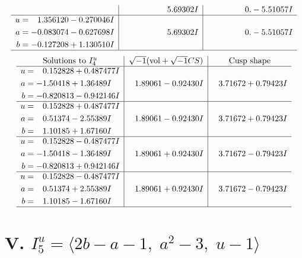 \documentclass[1p]{elsarticle_modified}
\theoremstyle{definition}
\newcommand{\I}{\sqrt{-1}}
\begin{document}
$$\begin{array}{c|c|c}
 & \phantom{-0.000000 -}5.69302 I & \phantom{-0.000000 } 0. - 5.51057 I \\ \hline\begin{aligned}
u &= \phantom{-}1.356120 - 0.270046 I \\
a &= -0.083074 - 0.627698 I \\
b &= -0.127208 + 1.130510 I\end{aligned}
 & \phantom{-0.000000 -}5.69302 I & \phantom{-0.000000 } 0. - 5.51057 I\\
 \hline 
 \end{array}$$\newpage$$\begin{array}{c|c|c}  
\text{Solutions to }I^u_{4}& \I (\text{vol} + \sqrt{-1}CS) & \text{Cusp shape}\\
 \hline 
\begin{aligned}
u &= \phantom{-}0.152828 + 0.487477 I \\
a &= -1.50418 + 1.36489 I \\
b &= -0.820813 - 0.942146 I\end{aligned}
 & \phantom{-}1.89061 - 0.92430 I & \phantom{-}3.71672 + 0.79423 I \\ \hline\begin{aligned}
u &= \phantom{-}0.152828 + 0.487477 I \\
a &= \phantom{-}0.51374 - 2.55389 I \\
b &= \phantom{-}1.10185 + 1.67160 I\end{aligned}
 & \phantom{-}1.89061 - 0.92430 I & \phantom{-}3.71672 + 0.79423 I \\ \hline\begin{aligned}
u &= \phantom{-}0.152828 - 0.487477 I \\
a &= -1.50418 - 1.36489 I \\
b &= -0.820813 + 0.942146 I\end{aligned}
 & \phantom{-}1.89061 + 0.92430 I & \phantom{-}3.71672 - 0.79423 I \\ \hline\begin{aligned}
u &= \phantom{-}0.152828 - 0.487477 I \\
a &= \phantom{-}0.51374 + 2.55389 I \\
b &= \phantom{-}1.10185 - 1.67160 I\end{aligned}
 & \phantom{-}1.89061 + 0.92430 I & \phantom{-}3.71672 - 0.79423 I\\
 \hline 
 \end{array}$$\newpage\newpage\renewcommand{\arraystretch}{1}
\centering \section*{V. $I^u_{5}= \langle 2 b- a-1,\;a^2-3,\;u-1 \rangle$}
\end{document}
